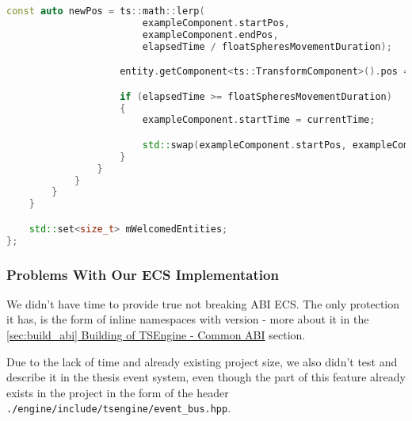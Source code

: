 \begin{itemize}
\begin{lstlisting}[language=c++, caption=\texttt{ExampleSystem} class (./game/systems/example\_system.hpp)]
                    const auto newPos = ts::math::lerp(
                        exampleComponent.startPos,
                        exampleComponent.endPos,
                        elapsedTime / floatSpheresMovementDuration);

                    entity.getComponent<ts::TransformComponent>().pos = newPos;

                    if (elapsedTime >= floatSpheresMovementDuration)
                    {
                        exampleComponent.startTime = currentTime;

                        std::swap(exampleComponent.startPos, exampleComponent.endPos);
                    }
                }
            }
        }
    }

    std::set<size_t> mWelcomedEntities;
};
\end{lstlisting}
\end{itemize}

\newpage
\subsubsection{Problems With Our ECS Implementation}
\hspace{\parindent}
We didn't have time to provide true not breaking ABI ECS. The only protection it has, is the form of inline namespaces with version - more about it in the \hyperref[sec:build_abi]{\ref*{sec:build_abi} Building of TSEngine - Common ABI} section.

Due to the lack of time and already existing project size, we also didn't test and describe it in the thesis event system, even though the part of this feature already exists in the project in the form of the header \\
\texttt{./engine/include/tsengine/event\_bus.hpp}.
